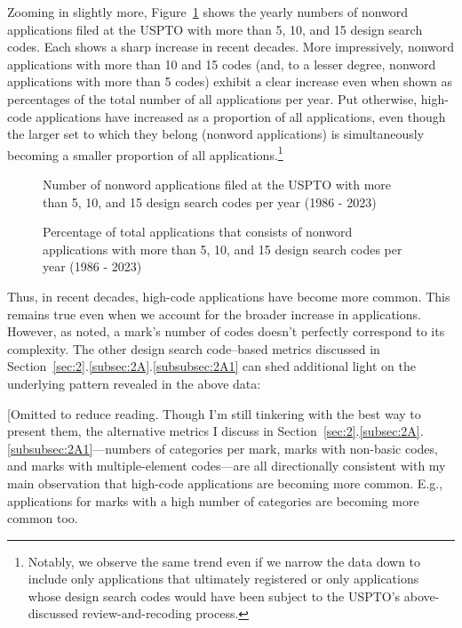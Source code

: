 \documentclass[letterpaper, 11pt, oneside]{article}
\begin{document}
Zooming in slightly more, Figure~\ref{fig:6} shows the yearly numbers of nonword applications filed at the USPTO with more than 5, 10, and 15 design search codes. Each shows a sharp increase in recent decades. More impressively, nonword applications with more than 10 and 15 codes (and, to a lesser degree, nonword applications with more than 5 codes) exhibit a clear increase even when shown as percentages of the total number of all applications per year. Put otherwise, high-code applications have increased as a proportion of all applications, even though the larger set to which they belong (nonword applications) is simultaneously becoming a smaller proportion of all applications.\footnote{Notably, we observe the same trend even if we narrow the data down to include only applications that ultimately registered or only applications whose design search codes would have been subject to the USPTO's above-discussed review-and-recoding process.}

\begin{figure}[H]
\centering

\caption{\label{fig:6} Number of nonword applications filed at the USPTO with more than 5, 10, and 15 design search codes per year (1986 - 2023)}
\end{figure}

\begin{figure}[H]
\centering

\caption{\label{fig:7} Percentage of total applications that consists of nonword applications with more than 5, 10, and 15 design search codes per year (1986 - 2023)}
\end{figure}

Thus, in recent decades, high-code applications have become more common. This remains true even when we account for the broader increase in applications. However, as noted, a mark's number of codes doesn't perfectly correspond to its complexity. The other design search code–based metrics discussed in Section~\ref{sec:2}.\ref{subsec:2A}.\ref{subsubsec:2A1} can shed additional light on the underlying pattern revealed in the above data:

[Omitted to reduce reading. Though I'm still tinkering with the best way to present them, the alternative metrics I discuss in Section~\ref{sec:2}.\ref{subsec:2A}.\ref{subsubsec:2A1}—numbers of categories per mark, marks with non-basic codes, and marks with multiple-element codes—are all directionally consistent with my main observation that high-code applications are becoming more common. E.g., applications for marks with a high number of categories are becoming more common too.
\end{document}
